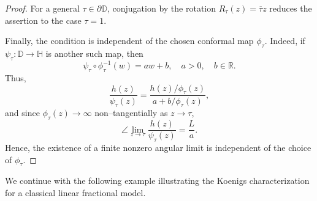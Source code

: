 \documentclass[12pt]{amsart}
\numberwithin{equation}{section}
\theoremstyle{plain}
\theoremstyle{definition}
\begin{document}
\begin{proof}
For a general $\tau\in\partial\mathbb{D}$, conjugation by the rotation
$R_\tau(z)=\overline{\tau}z$ reduces the assertion to the case
$\tau=1$.

Finally, the condition is independent of the chosen conformal map
$\phi_\tau$. Indeed, if $\psi_\tau:\mathbb{D}\to\mathbb{H}$ is another
such map, then
\begin{equation*}
\psi_\tau\circ\phi_\tau^{-1}(w)=aw+b,
\quad a>0,\quad b\in\mathbb{R}.
\end{equation*}
Thus,
\begin{equation*}
\frac{h(z)}{\psi_\tau(z)}
=
\frac{h(z)/\phi_\tau(z)}
     {a+b/\phi_\tau(z)},
\end{equation*}
and since $\phi_\tau(z)\to\infty$ non--tangentially as
$z\to\tau$,
\begin{equation*}
\angle\lim_{z\to\tau}
\frac{h(z)}{\psi_\tau(z)}
=
\frac{L}{a}.
\end{equation*}
Hence, the existence of a finite nonzero angular limit is independent
of the choice of $\phi_\tau$.
\end{proof}

We continue with the following example illustrating the Koenigs
characterization for a classical linear fractional model.
\end{document}
